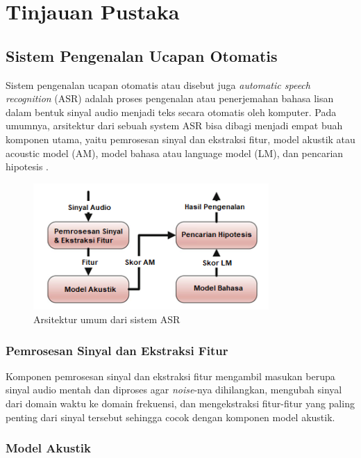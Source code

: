 \chapter{Tinjauan Pustaka}

\section{Sistem Pengenalan Ucapan Otomatis}

Sistem pengenalan ucapan otomatis atau disebut juga \textit{automatic speech recognition} (ASR) adalah proses pengenalan atau penerjemahan bahasa lisan dalam bentuk sinyal audio menjadi teks secara otomatis oleh komputer. Pada umumnya, arsitektur dari sebuah system ASR bisa dibagi menjadi empat buah komponen utama, yaitu pemrosesan sinyal dan ekstraksi fitur, model akustik atau acoustic model (AM), model bahasa atau language model (LM), dan pencarian hipotesis \parencite{Yu2014}.

\begin{figure}[h]
    \centering
    \includegraphics[width=0.8\textwidth]{resources/images/arsitektur-umum-asr.png}
    \caption{Arsitektur umum dari sistem ASR \parencite{Yu2014}}
\end{figure}


\subsection{Pemrosesan Sinyal dan Ekstraksi Fitur}

Komponen pemrosesan sinyal dan ekstraksi fitur mengambil masukan berupa sinyal audio mentah dan diproses agar \textit{noise}-nya dihilangkan, mengubah sinyal dari domain waktu ke domain frekuensi, dan mengekstraksi fitur-fitur yang paling penting dari sinyal tersebut sehingga cocok dengan komponen model akustik.

\subsection{Model Akustik}

